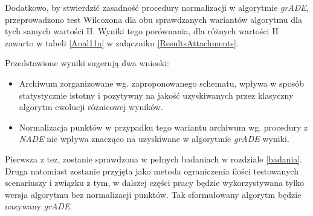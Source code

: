 \documentclass[12pt,a4paper]{report}
\begin{document}
{{{{{{{\par{
Dodatkowo, by stwierdzić zasadność procedury normalizacji w algorytmie \emph{grADE}, przeprowadzono test Wilcoxona dla obu sprawdzanych wariantów algorytmu dla tych samych wartości H. Wyniki tego porównania, dla różnych wartości H zawarto w tabeli \ref{Anal11a} w załączniku \ref{ResultsAttachments}.
}
\par{
Przedstawione wyniki sugerują dwa wnioski:
\begin{itemize}
\item Archiwum zorganizowane wg. zaproponowanego schematu, wpływa w sposób statystycznie istotny i pozytywny na jakość uzyskiwanych przez klasyczny algorytm ewolucji różnicowej wyników.
\item Normalizacja punktów w przypadku tego wariantu archiwum wg. procedury z \emph{NADE} nie wpływa znacząco na uzyskiwane w algorytmie \emph{grADE} wyniki.
\end{itemize}
}
\par{
Pierwsza z tez, zostanie sprawdzona w pełnych badaniach w rozdziale \ref{badania}. Druga natomiast zostanie przyjęta jako metoda ograniczenia ilości testowanych scenariuszy i związku z tym, w dalszej części pracy będzie wykorzystywana tylko wersja algorytmu bez normalizacji punktów. Tak sformułowany algorytm będzie nazywany \emph{grADE}.
}

}}}}}}}
\end{document}
